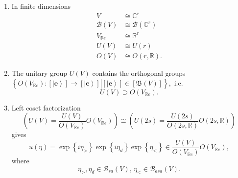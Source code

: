 \documentclass[aps,preprint]{revtex4}%
\newtheorem{lemma}[theorem]{Lemma}
\newtheorem{notation}[theorem]{Notation}
\begin{document}
\begin{enumerate}
\begin{notation}
\end{notation}

\begin{lemma}
The set of equivalence classes of bases is generated by the coset
$\frac{U\left(  V\right)  }{O\left(  V\right)  }$
\begin{equation}
\left[  \mathfrak{B}\left(  V\right)  \right]  =\left\{  \left.
\overset{}{T\left[  \left\vert \mathbf{e}\right\rangle \right]  }\right\vert
T\in\frac{U\left(  V\right)  }{O\left(  V\right)  }\right\}  .
\end{equation}

\end{lemma}

\item In finite dimensions
\begin{align}
V  &  \cong\mathbb{C}^{r}\\
\mathcal{B}\left(  V\right)   &  \cong\mathcal{B}\left(  \mathbb{C}^{r}\right)
\\
V_{\mathbb{R}e}  &  \cong\mathbb{R}^{r}\\
U\left(  V\right)   &  \cong U\left(  r\right) \\
O\left(  V\right)   &  \cong O\left(  r,\mathbb{R}\right)  .
\end{align}


\item The unitary group $U\left(  V\right)  $ contains the orthogonal groups
$\left\{  \left.  \overset{}{O\left(  V_{\mathbb{R}e}\right)  }:\left[
\left\vert \mathbf{e}\right\rangle \right]  \rightarrow\left[  \left\vert
\mathbf{e}\right\rangle \right]  \right\vert \left[  \left\vert \mathbf{e}%
\right\rangle \right]  \in\left[  \mathfrak{B}\left(  V\right)  \right]
\right\}  ,$ i.e.
\begin{equation}
U\left(  V\right)  \supset O\left(  V_{\mathbb{R}e}\right)  .
\end{equation}


\item Left coset factorization%
\begin{equation}
\left(  U\left(  V\right)  =\frac{U\left(  V\right)  }{O\left(  V_{\mathbb{R}%
e}\right)  }O\left(  V_{\mathbb{R}e}\right)  \right)  \cong\left(  U\left(
2s\right)  =\frac{U\left(  2s\right)  }{O\left(  2s,\mathbb{R}\right)
}O\left(  2s,\mathbb{R}\right)  \right)
\end{equation}
gives
\begin{equation}
u\left(  \mathbb{\eta}\right)  =\exp\left\{  i\mathbb{\eta}_{>}\right\}
\exp\left\{  i\mathbb{\eta}_{d}\right\}  \exp\left\{  \mathbb{\eta}%
_{<}\right\}  \in\frac{U\left(  V\right)  }{O\left(  V_{\mathbb{R}e}\right)
}O\left(  V_{\mathbb{R}e}\right)  ,
\end{equation}
where
\begin{equation}
\mathbb{\eta}_{>},\mathbb{\eta}_{d}\in\mathcal{B}_{sa}\left(  V\right)
,\,\mathbb{\eta}_{<}\in\mathcal{B}_{asa}\left(  V\right)  \text{.}%
\end{equation}



\end{enumerate}
\end{document}
